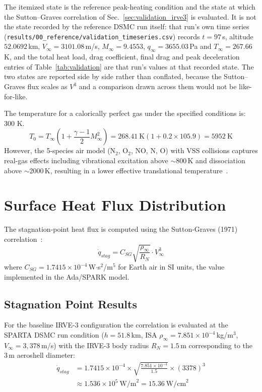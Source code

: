 The itemized state is the reference peak-heating condition and the state at which the Sutton--Graves correlation of Sec.~\ref{sec:validation_irve3} is evaluated. It is not the state recorded by the reference DSMC run itself: that run's own time series (\texttt{results/00\_reference/validation\_timeseries.csv}) records $t = 97$\,s, altitude $52.0692$\,km, $V_{\infty} = 3101.08$\,m/s, $M_{\infty} = 9.4553$, $q_{\infty} = 3655.03$\,Pa and $T_{\infty} = 267.66$\,K, and the total heat load, drag coefficient, final drag and peak deceleration entries of Table~\ref{tab:validation} are that run's values at that recorded state. The two states are reported side by side rather than conflated, because the Sutton--Graves flux scales as $V^3$ and a comparison drawn across them would not be like-for-like.

The temperature for a calorically perfect gas under the specified conditions is: 300 K.
\begin{equation}
    T_0 = T_{\infty} \left( 1 + \frac{\gamma - 1}{2} M_{\infty}^2 \right) = 268.41 \ \text{K} \left( 1 + 0.2 \times 105.9 \right) = 5952 \ \text{K}
\end{equation}
However, the 5-species air model (N$_2$, O$_2$, NO, N, O) with VSS collisions captures real-gas effects including vibrational excitation above $\sim$800\,K and dissociation above $\sim$2000\,K, resulting in a lower effective translational temperature~\cite{bird1994molecular}.

\section{Surface Heat Flux Distribution}
The stagnation-point heat flux is computed using the Sutton-Graves (1971) correlation~\cite{sutton1971gravesh}:
\begin{equation}
    \dot{q}_{stag} = C_{SG} \sqrt{\frac{\rho_{\infty}}{R_N}} \cdot V_{\infty}^3
\end{equation}
where $C_{SG} = 1.7415 \times 10^{-4}$\,W$\cdot$s$^2$/m$^{5}$ for Earth air in SI units, the value implemented in the Ada/SPARK model.

\subsection{Stagnation Point Results}
For the baseline IRVE-3 configuration the correlation is evaluated at the SPARTA DSMC run condition ($h = 51.8$\,km, ISA $\rho_{\infty} = 7.851 \times 10^{-4}$\,kg/m$^3$, $V_{\infty} = 3{,}378$\,m/s) with the IRVE-3 body radius $R_N = 1.5$\,m corresponding to the 3\,m aeroshell diameter:
\begin{equation}
    \begin{split}
        \dot{q}_{stag} &= 1.7415 \times 10^{-4} \times \sqrt{\frac{7.851 \times 10^{-4}}{1.5}} \times (3378)^3 \\
        &\approx 1.536 \times 10^{5} \ \text{W/m}^2 = 15.36 \ \text{W/cm}^2
    \end{split}
\end{equation}

